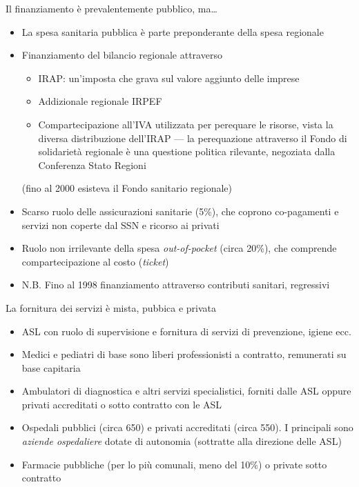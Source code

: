 \documentclass[aspectratio=64,11pt]{beamer}
\begin{document}
\begin{frame}{Il finanziamento è prevalentemente pubblico, ma\ldots{}}
\begin{itemize}
\item La spesa sanitaria pubblica è parte preponderante della spesa regionale
\item Finanziamento del bilancio regionale attraverso 
\begin{itemize}
\item \alert{IRAP}: un'imposta che grava sul valore aggiunto delle imprese
\item \alert{Addizionale regionale IRPEF}
\item \alert{Compartecipazione all'IVA} utilizzata per perequare le risorse, vista la
diversa distribuzione dell'IRAP --- la perequazione attraverso il Fondo di
solidarietà regionale è una questione politica rilevante, negoziata dalla
Conferenza Stato Regioni
\end{itemize}
(fino al 2000 esisteva il Fondo sanitario regionale)
\item Scarso ruolo delle assicurazioni sanitarie (5\%), che coprono co-pagamenti e
servizi non coperte dal SSN e ricorso ai privati
\item Ruolo non irrilevante della spesa \emph{out-of-pocket} (circa 20\%), che
comprende compartecipazione al costo (\emph{ticket})
\item N.B. Fino al 1998 finanziamento attraverso contributi sanitari, regressivi
\end{itemize}
\end{frame}

\begin{frame}{La fornitura dei servizi è mista, pubbica e privata}
\begin{itemize}
\item ASL con ruolo di supervisione e fornitura di servizi di prevenzione, igiene
ecc.
\item Medici e pediatri di base sono liberi professionisti a contratto,
remunerati su base capitaria
\item Ambulatori di diagnostica e altri servizi specialistici, forniti dalle ASL
oppure privati accreditati o sotto contratto con le ASL
\item Ospedali pubblici (circa 650) e privati accreditati (circa 550). I
principali sono \emph{aziende ospedaliere} dotate di autonomia (sottratte alla
direzione delle ASL)
\item Farmacie pubbliche (per lo più comunali, meno del 10\%) o private sotto
contratto
\end{itemize}
\end{frame}
\end{document}

